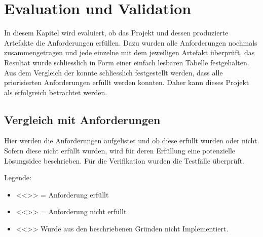 \chapter{Evaluation und Validation}
\label{ch:Eval}
In diesem Kapitel wird evaluiert, ob das Projekt und dessen produzierte Artefakte die Anforderungen erfüllen. Dazu wurden alle Anforderungen nochmals zusammengetragen und jede einzelne mit dem jeweiligen Artefakt überprüft, das Resultat wurde schliesslich in Form einer einfach lesbaren Tabelle festgehalten. Aus dem Vergleich der konnte schliesslich festgestellt werden, dass alle priorisierten Anforderungen erfüllt werden konnten. Daher kann dieses Projekt als erfolgreich betrachtet werden.

\section{Vergleich mit Anforderungen}
\label{sec:VergleichAnforderungen}
Hier werden die Anforderungen aufgelistet und ob diese erfüllt wurden oder nicht. Sofern diese nicht erfüllt wurden, wird für deren Erfüllung eine potenzielle Lösungsidee beschrieben. Für die Verifikation wurden die Testfälle überprüft.

Legende:
\begin{itemize}[label={}, noitemsep]
	\item <<\checkmark >> = Anforderung erfüllt
	\item <<\xmark>> = Anforderung nicht erfüllt
	\item <<\notmark>> Wurde aus den beschriebenen Gründen nicht Implementiert.
\end{itemize}


